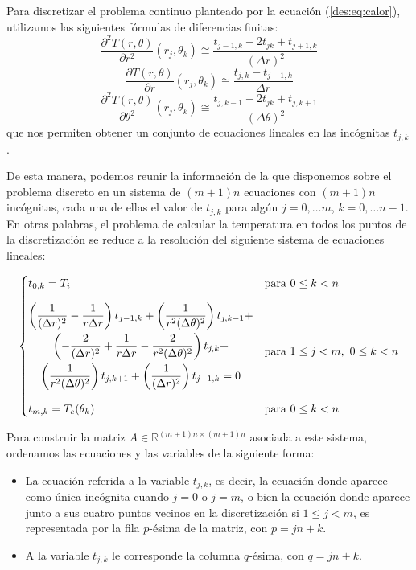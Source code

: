       Para discretizar el problema continuo planteado por la ecuación (\ref{des:eq:calor}), utilizamos las siguientes fórmulas de diferencias finitas:
      \[ \frac{\partial^2 T(r, \theta)}{\partial r^2}(r_j, \theta_k) \cong \frac{t_{j-1,k} - 2 t_{jk} + t_{j+1,k}}{(\Delta r)^2} \]
      \[ \frac{\partial T(r, \theta)}{\partial r}(r_j, \theta_k) \cong \frac{t_{j,k} - t_{j-1,k}}{\Delta r} \]
      \[ \frac{\partial^2 T(r, \theta)}{\partial \theta^2}(r_j, \theta_k) \cong \frac{t_{j,k-1} - 2 t_{jk} + t_{j,k+1}}{(\Delta \theta)^2} \]
      que nos permiten obtener un conjunto de ecuaciones lineales en las incógnitas $t_{j,k}$.

      De esta manera, podemos reunir la información de la que disponemos sobre el problema discreto en un sistema de $(m+1)n$ ecuaciones con $(m+1)n$ incógnitas, cada una de ellas el valor de $t_{j,k}$ para algún $j = 0, \dots m$, $k = 0, \dots n-1$. En otras palabras, el problema de calcular la temperatura en todos los puntos de la discretización se reduce a la resolución del siguiente sistema de ecuaciones lineales:

      \begin{equation} \label{des:eq:sistema}
        \begin{cases}
        \setlength{\jot}{2em}
          t_{0,k} = T_i
            & \text{para } 0 \leq k < n \\[1em]
          \begin{gathered}
            \left( \frac{1}{(\Delta r)^2} - \frac{1}{r \Delta r} \right) t_{j-1,k} +
              \left( \frac{1}{r^2(\Delta \theta)^2} \right) t_{j,k-1} + \\
              \left( - \frac{2}{(\Delta r)^2} + \frac{1}{r \Delta r} - \frac{2}{r^2(\Delta \theta)^2} \right) t_{j,k} + \\
              \left( \frac{1}{r^2(\Delta \theta)^2} \right) t_{j,k+1} +
              \left( \frac{1}{(\Delta r)^2} \right) t_{j+1,k} = 0 \\[1em]
            \end{gathered}
            & \text{para } 1 \leq j < m,\ 0 \leq k < n \\
          t_{m,k} = T_e(\theta_k)
            & \text{para } 0 \leq k < n \\
        \end{cases}
      \end{equation}

      Para construir la matriz $A \in \mathbb{R}^{(m+1)n \times (m+1)n}$ asociada a este sistema, ordenamos las ecuaciones y las variables de la siguiente forma:
      \begin{itemize}
        \item La ecuación referida a la variable $t_{j,k}$, es decir, la ecuación donde aparece como única incógnita cuando $j = 0$ o $j = m$, o bien la ecuación donde aparece junto a sus cuatro puntos vecinos en la discretización si $1 \leq j < m$, es representada por la fila $p$-ésima de la matriz, con $p = jn+k$.
        \item A la variable $t_{j,k}$ le corresponde la columna $q$-ésima, con $q = jn+k$.
      \end{itemize}

